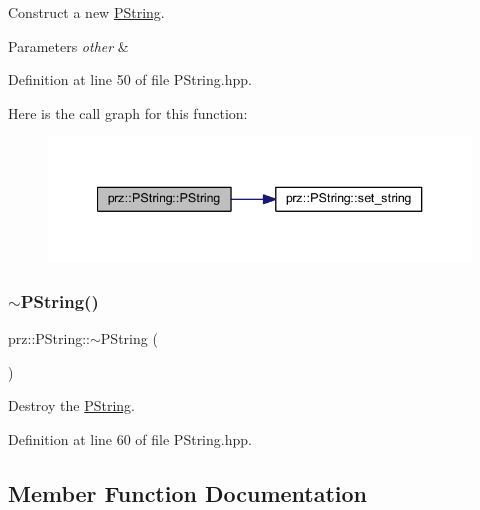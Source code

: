Construct a new \mbox{\hyperlink{classprz_1_1_p_string}{P\+String}}. 


\begin{DoxyParams}{Parameters}
{\em other} & \\
\hline
\end{DoxyParams}


Definition at line 50 of file P\+String.\+hpp.

Here is the call graph for this function\+:
\nopagebreak
\begin{figure}[H]
\begin{center}
\leavevmode
\includegraphics[width=340pt]{classprz_1_1_p_string_ae72acc504d808db97ea7a35db14ff36a_cgraph}
\end{center}
\end{figure}
\mbox{\label{classprz_1_1_p_string_a5859e66659c9db811447d97a9de9e976}} 
\subsubsection{\texorpdfstring{$\sim$PString()}{~PString()}}
{\footnotesize\ttfamily prz\+::\+P\+String\+::$\sim$\+P\+String (\begin{DoxyParamCaption}{ }\end{DoxyParamCaption})\hspace{0.3cm}{\ttfamily [inline]}}



Destroy the \mbox{\hyperlink{classprz_1_1_p_string}{P\+String}}. 



Definition at line 60 of file P\+String.\+hpp.



\subsection{Member Function Documentation}
\mbox{\label{classprz_1_1_p_string_af7507e210bb80e4cd2f8bbf3e881de99}} 
